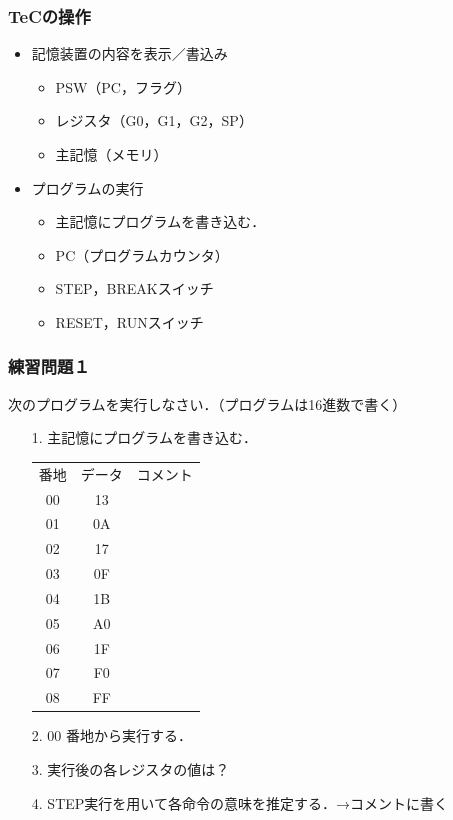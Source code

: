 \documentclass[handout]{beamer}         %
\begin{document}
\begin{frame}
  \frametitle{TeCの操作}
  \begin{itemize}
    \item{記憶装置の内容を表示／書込み}
      \begin{itemize}
        \item PSW（PC，フラグ）
        \item レジスタ（G0，G1，G2，SP）
        \item 主記憶（メモリ）
      \end{itemize}
      \vfill
    \item{プログラムの実行}
      \begin{itemize}
        \item 主記憶にプログラムを書き込む．
        \item PC（プログラムカウンタ）
        \item STEP，BREAKスイッチ
        \item RESET，RUNスイッチ
    \end{itemize}
  \end{itemize}
  \vfill
  \vfill
\end{frame}

\begin{frame}
  \frametitle{練習問題１}
  次のプログラムを実行しなさい．（プログラムは16進数で書く）
  \begin{enumerate}
    \item[1.] 主記憶にプログラムを書き込む．\\
      \begin{tabular}{c c l}
        番地 & データ & コメント \\
        00   & 13     &          \\
        01   & 0A     &          \\
        02   & 17     &          \\
        03   & 0F     &          \\
        04   & 1B     &          \\
        05   & A0     &          \\
        06   & 1F     &          \\
        07   & F0     &          \\
        08   & FF     &          \\
      \end{tabular}
    \item[2.] 00 番地から実行する．
    \item[3.] 実行後の各レジスタの値は？
    \item[4.] STEP実行を用いて各命令の意味を推定する．→コメントに書く
  \end{enumerate}
\end{frame}
\end{document}
